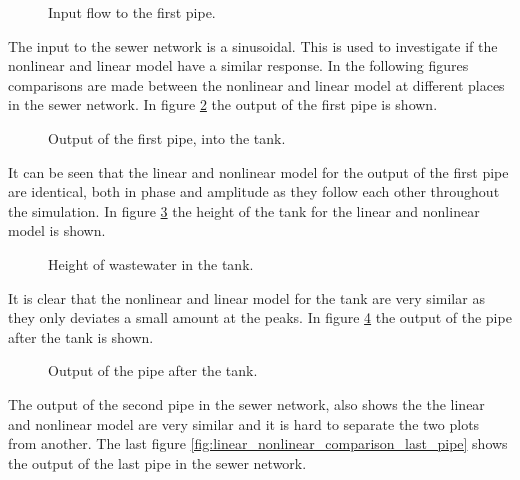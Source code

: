\begin{figure}[H]
 \centering
 
\caption{Input flow to the first pipe.}
\label{fig:linear_nonlinear_comparison_input_to_first_pipe}
\end{figure}
The input to the sewer network is a sinusoidal. This is used to investigate if the nonlinear and linear model have a similar response. 
In the following figures comparisons are made between the nonlinear and linear model at different places in the sewer network. In figure \ref{fig:linear_nonlinear_comparison_input_first_pipe_into_tank} the output of the first pipe is shown.

\begin{figure}[H]
 \centering
 
\caption{Output of the first pipe, into the tank.}
\label{fig:linear_nonlinear_comparison_input_first_pipe_into_tank}
\end{figure}

It can be seen that the linear and nonlinear model for the output of the first pipe are identical, both in phase and amplitude as they follow each other throughout the simulation. In figure \ref{fig:linear_nonlinear_comparison_tank_height} the height of the tank for the linear and nonlinear model is shown.   

\begin{figure}[H]
 \centering
 
\caption{Height of wastewater in the tank. }
\label{fig:linear_nonlinear_comparison_tank_height}
\end{figure}
 
It is clear that the nonlinear and linear model for the tank are very similar as they only deviates a small amount at the peaks. In figure \ref{fig:linear_nonlinear_comparison_pipe_after_tank} the output of the pipe after the tank is shown.  

\begin{figure}[H]
 \centering
 
\caption{Output of the pipe after the tank.}
\label{fig:linear_nonlinear_comparison_pipe_after_tank}
\end{figure}
  
The output of the second pipe in the sewer network, also shows the the linear and nonlinear model are very similar and it is hard to separate the two plots from another. The last figure \ref{fig:linear_nonlinear_comparison_last_pipe} shows the output of the last pipe in the sewer network. 

